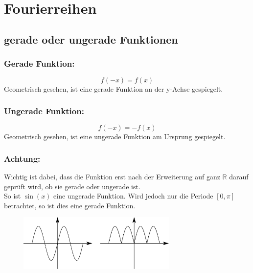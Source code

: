 



\section{Fourierreihen}

\subsection{gerade oder ungerade Funktionen}

\subsubsection{Gerade Funktion: }
\[ \boxed{f(-x) = f(x)} \]
Geometrisch gesehen, ist eine gerade Funktion an der y-Achse gespiegelt.
\subsubsection{Ungerade Funktion: }
\[ \boxed{f(-x) = -f(x)} \]
Geometrisch gesehen, ist eine ungerade Funktion am Ursprung gespiegelt.
\subsubsection{Achtung: }
Wichtig ist dabei, dass die Funktion erst nach der Erweiterung auf ganz $\mathbb{R}$ darauf geprüft wird, ob sie gerade oder ungerade ist. \\
So ist $\sin(x)$ eine ungerade Funktion. Wird jedoch nur die Periode $[0, \pi]$ betrachtet, so ist dies eine gerade Funktion.

\begin{figure}[h!]
\centering
\includegraphics[width=0.7\textwidth]{geradeungerade.pdf}
\end{figure}

